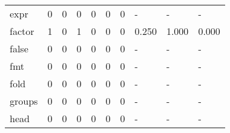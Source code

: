 \begin{longtable}{lp{1.3cm}p{1.3cm}p{1.3cm}p{1.3cm}p{1.3cm}p{1.3cm}p{1.3cm}p{1.3cm}p{1.3cm}}
expr      &                      0 &                                             0 &                                            0 &                                           0 &                                            0 &                                          0 &                                    - &                                      - &                                    - \\
factor    &                      1 &                                             0 &                                            1 &                                           0 &                                            0 &                                          0 &                                0.250 &                                  1.000 &                                0.000 \\
false     &                      0 &                                             0 &                                            0 &                                           0 &                                            0 &                                          0 &                                    - &                                      - &                                    - \\
fmt       &                      0 &                                             0 &                                            0 &                                           0 &                                            0 &                                          0 &                                    - &                                      - &                                    - \\
fold      &                      0 &                                             0 &                                            0 &                                           0 &                                            0 &                                          0 &                                    - &                                      - &                                    - \\
groups    &                      0 &                                             0 &                                            0 &                                           0 &                                            0 &                                          0 &                                    - &                                      - &                                    - \\
head      &                      0 &                                             0 &                                            0 &                                           0 &                                            0 &                                          0 &                                    - &                                      - &                                    - \\

\end{longtable}
